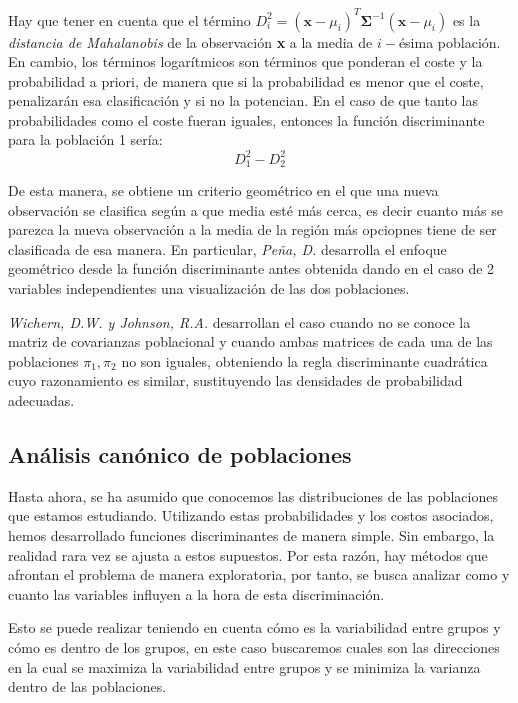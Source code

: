 \noindent Hay que tener en cuenta que el término $D_i^2=(\textbf{x}-\mu_i)^T \mathbf{\Sigma}^{-1} (\textbf{x}-\mu_i)$ es la \emph{distancia de Mahalanobis} de la observación \textbf{x} a la media de $i-$ésima población. En cambio, los  términos logarítmicos son términos que ponderan el coste y la probabilidad a priori, de manera que si la probabilidad es menor que el coste, penalizarán esa clasificación y si no la potencian. En el caso de que tanto las probabilidades como el coste fueran iguales, entonces la función discriminante para la población 1 sería:
\begin{equation}
D_1^2-D_2^2
\end{equation}

\noindent De esta manera, se obtiene un criterio geométrico \cite{Cuadras 2014} en el que una nueva observación se clasifica según a que media esté más cerca, es decir cuanto más se parezca la nueva observación a la media de la región más opciopnes tiene de ser clasificada de esa manera.  En particular, \emph{Peña, D.} \cite{Peña 2002} desarrolla el enfoque geométrico desde la función discriminante antes obtenida dando en el caso de 2 variables independientes una visualización de las dos poblaciones.

\noindent \emph{Wichern, D.W. y Johnson, R.A.}\cite{Johnson 2007} desarrollan  el caso cuando no se conoce la matriz de covarianzas poblacional y cuando ambas matrices de cada una de las poblaciones $\pi_1,\pi_2$ no son iguales, obteniendo la regla discriminante cuadrática cuyo razonamiento es similar, sustituyendo las densidades de probabilidad adecuadas.


\subsection{Análisis canónico de poblaciones}

\noindent Hasta ahora, se ha asumido que conocemos las distribuciones de las poblaciones que estamos estudiando. Utilizando estas probabilidades y los costos asociados, hemos desarrollado funciones discriminantes de manera simple. Sin embargo, la realidad rara vez se ajusta a estos supuestos. Por esta razón, hay métodos que afrontan el problema de manera exploratoria, por tanto, se busca analizar como y cuanto las variables influyen a la hora de esta discriminación. 

\noindent Esto se puede realizar teniendo en cuenta cómo es la variabilidad entre grupos y cómo es dentro de los grupos, en este caso buscaremos cuales son las direcciones en la cual se maximiza la variabilidad entre grupos y se minimiza la varianza dentro de las poblaciones.

